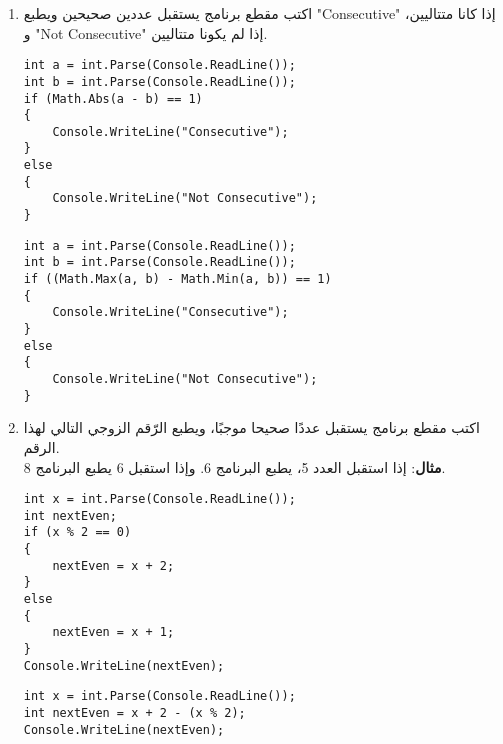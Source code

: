 ﻿\documentclass[14pt]{extarticle}
\begin{document}
\begin{enumerate}[itemsep=3em]

\item
اكتب مقطع برنامج يستقبل عددين صحيحين ويطبع \textenglish{"Consecutive"} إذا كانا متتاليين، و \textenglish{"Not Consecutive"} إذا لم يكونا متتاليين.

\ifwithsols
\begin{boxSolution}[1]
\begin{english}
\begin{verbatim}
int a = int.Parse(Console.ReadLine());
int b = int.Parse(Console.ReadLine());
if (Math.Abs(a - b) == 1)
{
    Console.WriteLine("Consecutive");
}
else
{
    Console.WriteLine("Not Consecutive");
}
\end{verbatim}
\end{english}
\end{boxSolution}
\begin{boxSolution}[2]
\begin{english}
\begin{verbatim}
int a = int.Parse(Console.ReadLine());
int b = int.Parse(Console.ReadLine());
if ((Math.Max(a, b) - Math.Min(a, b)) == 1)
{
    Console.WriteLine("Consecutive");
}
else
{
    Console.WriteLine("Not Consecutive");
}
\end{verbatim}
\end{english}
\end{boxSolution}
\clearpage
\fi

\item
اكتب مقطع برنامج يستقبل عددًا صحيحا موجبًا، ويطبع الرّقم الزوجي التالي لهذا الرقم.\\
\textbf{مثال}: إذا استقبل العدد 5، يطبع البرنامج 6. وإذا استقبل 6 يطبع البرنامج 8.

\ifwithsols
\begin{boxSolution}[1]
\begin{english}
\begin{verbatim}
int x = int.Parse(Console.ReadLine());
int nextEven;
if (x % 2 == 0)
{
    nextEven = x + 2;
}
else
{
    nextEven = x + 1;
}
Console.WriteLine(nextEven);
\end{verbatim}
\end{english}
\end{boxSolution}
\begin{boxSolution}[2]
\begin{english}
\begin{verbatim}
int x = int.Parse(Console.ReadLine());
int nextEven = x + 2 - (x % 2);
Console.WriteLine(nextEven);
\end{verbatim}
\end{english}
\end{boxSolution}
\clearpage
\fi


\end{enumerate}
\end{document}
